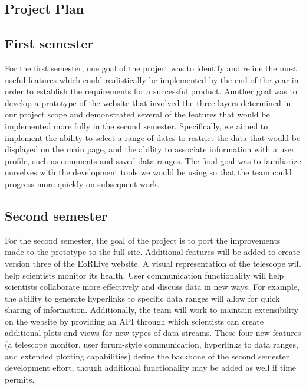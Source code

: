 \documentclass[12pt]{article}
\begin{document}
\begin{spacing}{1.5}
\section{Project Plan}
\subsection{First semester}
For the first semester, one goal of the project was to identify and refine the most useful features which could realistically be implemented by the end of the year in order to establish the requirements for a successful product. Another goal was to develop a prototype of the website that involved the three layers determined in our project scope and demonstrated several of the features that would be implemented more fully in the second semester. Specifically, we aimed to implement the ability to select a range of dates to restrict the data that would be displayed on the main page, and the ability to associate information with a user profile, such as comments and saved data ranges. The final goal was to familiarize ourselves with the development tools we would be using so that the team could progress more quickly on subsequent work.
\subsection{Second semester}
For the second semester, the goal of the project is to port the improvements made to the prototype to the full site. Additional features will be added to create version three of the EoRLive website. A visual representation of the telescope will help scientists monitor its health. User communication functionality will help scientists collaborate more effectively and discuss data in new ways. For example, the ability to generate hyperlinks to specific data ranges will allow for quick sharing of information. Additionally, the team will work to maintain extensibility on the website by providing an API through which scientists can create additional plots and views for new types of data streams. These four new features (a telescope monitor, user forum-style communication, hyperlinks to data ranges, and extended plotting capabilities) define the backbone of the second semester development effort, though additional functionality may be added as well if time permits.


\end{spacing}
\end{document}
